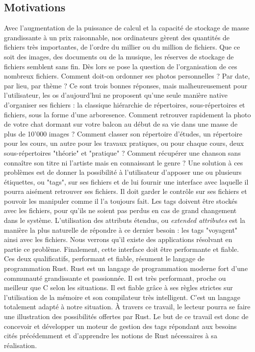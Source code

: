 \subsection{Motivations}
Avec l'augmentation de la puissance de calcul et la capacité de stockage de masse grandissante à un 
prix raisonnable, nos ordinateurs gèrent des quantités de fichiers très importantes, de l'ordre du 
millier ou du million de fichiers. Que ce soit des images, des documents ou de la musique, les 
réserves de stockage de fichiers semblent sans fin. Dès lors se pose la question de l'organisation 
de ces nombreux fichiers. Comment doit-on ordonner ses photos personnelles ? Par date, par lieu, 
par thème ? Ce sont trois bonnes réponses, mais malheureusement pour l'utilisateur, les \acrshort{os} 
d'aujourd'hui ne proposent qu'une seule manière native d'organiser ses fichiers : 
la classique hiérarchie de répertoires, sous-répertoires et fichiers, sous la forme d'une arboresence.
\bigbreak
Comment retrouver rapidement la photo de votre chat dormant sur votre balcon au début de sa vie 
dans une masse de plus de 10'000 images ? Comment classer son répertoire d'études, un répertoire 
pour les cours, un autre pour les travaux pratiques, ou pour chaque cours, deux sous-répertoires 
"théorie" et "pratique" ? Comment récupérer une chanson sans connaître son titre ni l'artiste mais 
en connaissant le genre ? Une solution à ces problèmes est de donner la possibilité à l'utilisateur 
d'apposer une ou plusieurs étiquettes, ou "tags", sur ses fichiers et de lui fournir une interface 
avec laquelle il pourra aisément retrouver ses fichiers. Il doit garder le contrôle sur ses fichiers 
et pouvoir les manipuler comme il l'a toujours fait. Les tags doivent être stockés avec les fichiers, 
pour qu'ils ne soient pas perdus en cas de grand changement dans le système. L'utilisation des 
attributs étendus, ou \textit{extended attributes} est la manière la plus naturelle de répondre à 
ce dernier besoin : les tags "voyagent" ainsi avec les fichiers. Nous verrons qu'il existe 
des applications résolvant en partie ce problème. Finalement, cette interface doit être performante et fiable. 
\bigbreak
Ces deux qualificatifs, performant et fiable, résument le langage de programmation Rust. Rust est 
un langage de programmation moderne fort d'une communauté grandissante et passionnée. Il est très 
performant, proche ou meilleur que C selon les situations. Il est fiable grâce à ses règles strictes 
sur l'utilisation de la mémoire et son compilateur très intelligent. C'est un langage totalement 
adapté à notre situation. À travers ce travail, le lecteur pourra se faire une illustration des 
possibilités offertes par Rust.
\bigbreak
Le but de ce travail est donc de concevoir et développer un moteur de gestion des tags répondant 
aux besoins cités précédemment et d'apprendre les notions de Rust nécessaires à sa réalisation.
\newpage

